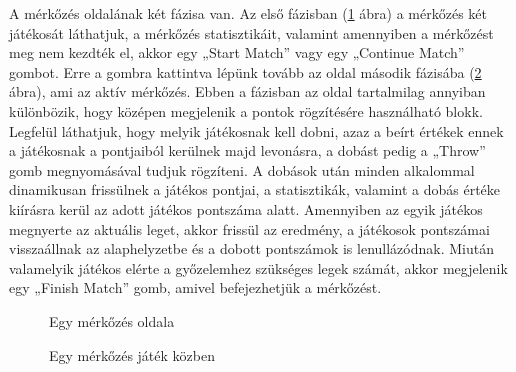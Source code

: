 A mérkőzés oldalának két fázisa van. Az első fázisban (\ref{fig:matchTest1} ábra) a mérkőzés két játékosát láthatjuk, a mérkőzés statisztikáit, valamint amennyiben a mérkőzést meg nem kezdték el, akkor egy „Start Match” vagy egy „Continue Match” gombot. Erre a gombra kattintva lépünk tovább az oldal második fázisába (\ref{fig:matchTest2} ábra), ami az aktív mérkőzés. Ebben a fázisban az oldal tartalmilag annyiban különbözik, hogy középen megjelenik a pontok rögzítésére használható blokk. Legfelül láthatjuk, hogy melyik játékosnak kell dobni, azaz a beírt értékek ennek a játékosnak a pontjaiból kerülnek majd levonásra, a dobást pedig a „Throw” gomb megnyomásával tudjuk rögzíteni. A dobások után minden alkalommal dinamikusan frissülnek a játékos pontjai, a statisztikák, valamint a dobás értéke kiírásra kerül az adott játékos pontszáma alatt. Amennyiben az egyik játékos megnyerte az aktuális leget, akkor frissül az eredmény, a játékosok pontszámai visszaállnak az alaphelyzetbe és a dobott pontszámok is lenullázódnak. Miután valamelyik játékos elérte a győzelemhez szükséges legek számát, akkor megjelenik egy „Finish Match” gomb, amivel befejezhetjük a mérkőzést.

\begin{figure}[h]
\centering
{}
\caption{Egy mérkőzés oldala}
\label{fig:matchTest1}
\end{figure}

\begin{figure}[h]
\centering
{}
\caption{Egy mérkőzés játék közben}
\label{fig:matchTest2}
\end{figure}

